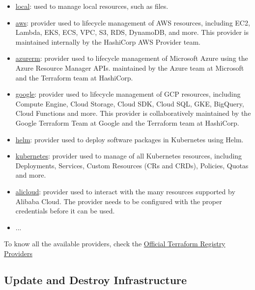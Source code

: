 \documentclass{article}
\begin{document}
\begin{itemize}
    \item \href{https://registry.terraform.io/providers/hashicorp/local/latest}{local}:  used to manage local resources, such as files.
    \item \href{https://registry.terraform.io/providers/hashicorp/aws/latest}{aws}: provider used to lifecycle management of AWS resources, including EC2, Lambda, EKS, ECS, VPC, S3, RDS, DynamoDB, and more. This provider is maintained internally by the HashiCorp AWS Provider team.
    \item \href{https://registry.terraform.io/providers/hashicorp/azurerm/latest}{azurerm}: provider used to lifecycle management of Microsoft Azure using the Azure Resource Manager APIs. maintained by the Azure team at Microsoft and the Terraform team at HashiCorp.
    \item \href{https://registry.terraform.io/providers/hashicorp/google/latest}{google}: provider used to lifecycle management of GCP resources, including Compute Engine, Cloud Storage, Cloud SDK, Cloud SQL, GKE, BigQuery, Cloud Functions and more. This provider is collaboratively maintained by the Google Terraform Team at Google and the Terraform team at HashiCorp.
    \item \href{https://registry.terraform.io/providers/hashicorp/helm/latest}{helm}: provider used to deploy software packages in Kubernetes using Helm.
    \item \href{https://registry.terraform.io/providers/hashicorp/kubernetes/latest}{kubernetes}: provider used to manage of all Kubernetes resources, including Deployments, Services, Custom Resources (CRs and CRDs), Policies, Quotas and more.
    \item \href{https://registry.terraform.io/providers/aliyun/alicloud/latest}{alicloud}: provider used to interact with the many resources supported by Alibaba Cloud. The provider needs to be configured with the proper credentials before it can be used.
    \item ...
\end{itemize}

To know all the available providers, check the \href{https://registry.terraform.io/browse/providers}{Official Terraform Registry Providers}

\subsection{Update and Destroy Infrastructure}
\end{document}
